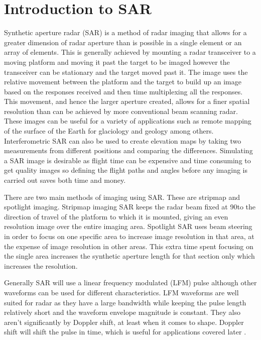 \section{Introduction to SAR}

Synthetic aperture radar (SAR) is a method of radar imaging that allows for a greater dimension of radar aperture than is possible in a single element or an array of elements. This is generally achieved by mounting a radar transceiver to a moving platform and moving it past the target to be imaged however the transceiver can be stationary and the target moved past it. The image uses the relative movement between the platform and the target to build up an image based on the responses received and then time multiplexing all the responses. This movement, and hence the larger aperture created, allows for a finer spatial resolution than can be achieved by more conventional beam scanning radar. These images can be useful for a variety of applications such as remote mapping of the surface of the Earth for glaciology and geology among others. Interferometric SAR can also be used to create elevation maps by taking two measurements from different positions and comparing the differences.
Simulating a SAR image is desirable as flight time can be expensive and time consuming to get quality images so defining the flight paths and angles before any imaging is carried out saves both time and money. \par
There are two main methods of imaging using SAR. These are stripmap and spotlight imaging. Stripmap imaging SAR keeps the radar beam fixed at 90\degree to the direction of travel of the platform to which it is mounted, giving an even resolution image over the entire imaging area. Spotlight SAR uses beam steering in order to focus on one specific area to increase image resolution in that area, at the expense of image resolution in other areas. This extra time spent focusing on the single area increases the synthetic aperture length for that section only which increases the resolution.\par
Generally SAR will use a linear frequency modulated (LFM) pulse although other waveforms can be used for different characteristics. LFM waveforms are well suited for radar as they have a large bandwidth while keeping the pulse length relatively short and the waveform envelope magnitude is constant. They also aren't significantly by Doppler shift, at least when it comes to shape. Doppler shift will shift the pulse in time, which is useful for applications covered later \cite{duerschBackprojectionSyntheticAperture2013}.

